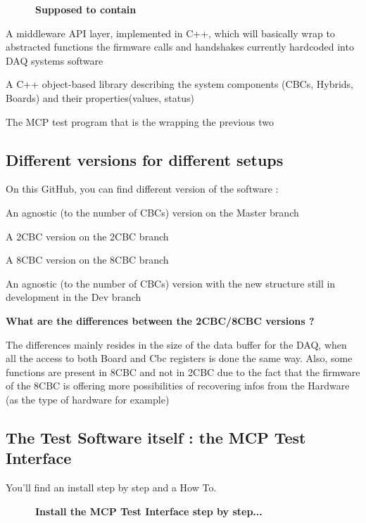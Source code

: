 ~~~~~~{\bfseries Supposed to contain}


\begin{DoxyItemize}
\item A middleware A\-P\-I layer, implemented in C++, which will basically wrap to abstracted functions the firmware calls and handshakes currently hardcoded into D\-A\-Q systems software
\item A C++ object-\/based library describing the system components (C\-B\-Cs, Hybrids, Boards) and their properties(values, status)
\item The M\-C\-P test program that is the wrapping the previous two
\end{DoxyItemize}

\subsection*{Different versions for different setups }

On this Git\-Hub, you can find different version of the software \-:
\begin{DoxyItemize}
\item An agnostic (to the number of C\-B\-Cs) version on the Master branch
\item A 2\-C\-B\-C version on the 2\-C\-B\-C branch
\item A 8\-C\-B\-C version on the 8\-C\-B\-C branch
\item An agnostic (to the number of C\-B\-Cs) version with the new structure still in development in the Dev branch \par
 \par
 {\bfseries What are the differences between the 2\-C\-B\-C/8\-C\-B\-C versions ?}
\end{DoxyItemize}

The differences mainly resides in the size of the data buffer for the D\-A\-Q, when all the access to both Board and Cbc registers is done the same way. Also, some functions are present in 8\-C\-B\-C and not in 2\-C\-B\-C due to the fact that the firmware of the 8\-C\-B\-C is offering more possibilities of recovering infos from the Hardware (as the type of hardware for example)

\subsection*{The Test Software itself \-: the M\-C\-P Test Interface }

You'll find an install step by step and a How To. \par
 \par
 ~~~~~~{\bfseries Install the M\-C\-P Test Interface step by step...}

